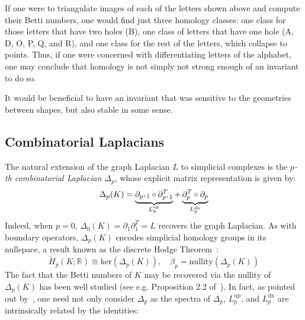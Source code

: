 \documentclass[10pt]{article}
\numberwithin{equation}{section}
\newcommand{\+}{%
	\raisebox{0.18ex}{\scaleobj{0.55}{+}}
}
\theoremstyle{definition}
\theoremstyle{definition}
\begin{document}
\noindent If one were to triangulate images of each of the letters shown above and compute their Betti numbers, one would find just three homology classes: one class for those letters that have two holes (B), one class of letters that have one hole (A, D, O, P, Q, and R), and one class for the rest of the letters, which collapse to points. Thus, if one were concerned with differentiating letters of the alphabet, one may conclude that homology is not simply not strong enough of an invariant to do so. 

It would be beneficial to have an invariant that was sensitive to the geometries between shapes, but also stable in some sense.
\newpage

\subsection{Combinatorial Laplacians}\label{sec:laplacian_theory}
The natural extension of the graph Laplacian $L$ to simplicial complexes is the \emph{$p$-th combinatorial Laplacian} $\Delta_p$, whose explicit matrix representation is given by: 
\begin{equation}\label{eq:comb_lap}
	\Delta_p(K) = 
	\underbrace{\partial_{p\+1} \circ \partial_{p\+1}^T}_{L_p^{\text{up}}} + \underbrace{\partial_{p}^T  \circ  \partial_{p}}_{L_p^{\text{dn}}} 
\end{equation}
\noindent Indeed, when $p = 0$, $\Delta_0(K) = \partial_1 \partial_1^T = L$ recovers the graph Laplacian. 
As with boundary operators, $\Delta_p(K)$ encodes simplicial homology groups in its nullspace, a result known as the discrete Hodge Theorem~\cite{}: 
\begin{equation}\label{eq:laplace_hom}
	\tilde{H}_p(K; \mathbb{R}) \cong \mathrm{ker}(\Delta_p(K)), \quad \beta_p = \mathrm{nullity}(\Delta_p(K))
\end{equation}
The fact that the Betti numbers of $K$ may be recovered via the nullity of $\Delta_p(K)$ has been well studied (see e.g. Proposition 2.2 of~\cite{}). 
In fact, as pointed out by~\cite{}, one need not only consider $\Delta_p$ as the spectra of $\Delta_p$, $L_p^{\text{up}}$, and $L_p^{\text{dn}}$ are intrinsically related by the identities:
\end{document}
